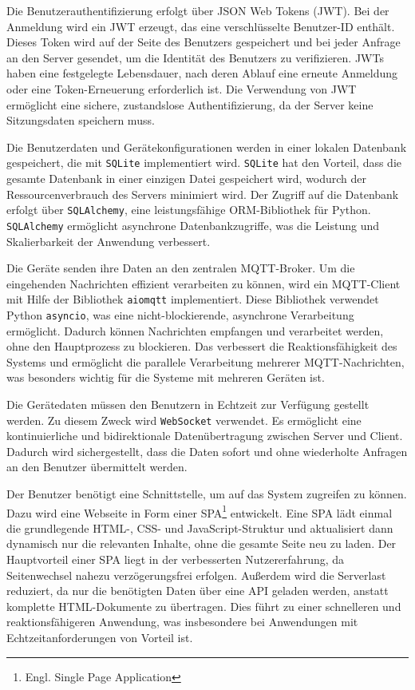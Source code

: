 \documentclass[12pt, letterpaper]{article}
\begin{document}
\par Die Benutzerauthentifizierung erfolgt über JSON Web Tokens (JWT). Bei der Anmeldung wird ein JWT erzeugt, das eine verschlüsselte Benutzer-ID enthält. Dieses Token wird auf der Seite des Benutzers gespeichert und bei jeder Anfrage an den Server gesendet, um die Identität des Benutzers zu verifizieren. JWTs haben eine festgelegte Lebensdauer, nach deren Ablauf eine erneute Anmeldung oder eine Token-Erneuerung erforderlich ist. Die Verwendung von JWT ermöglicht eine sichere, zustandslose Authentifizierung, da der Server keine Sitzungsdaten speichern muss.
\par Die Benutzerdaten und Gerätekonfigurationen werden in einer lokalen Datenbank gespeichert, die mit \texttt{SQLite} implementiert wird. \texttt{SQLite} hat den Vorteil, dass die gesamte Datenbank in einer einzigen Datei gespeichert wird, wodurch der Ressourcenverbrauch des Servers minimiert wird. Der Zugriff auf die Datenbank erfolgt über \texttt{SQLAlchemy}, eine leistungsfähige ORM-Bibliothek für Python. \texttt{SQLAlchemy} ermöglicht asynchrone Datenbankzugriffe, was die Leistung und Skalierbarkeit der Anwendung verbessert.
\par Die Geräte senden ihre Daten an den zentralen MQTT-Broker. Um die eingehenden Nachrichten effizient verarbeiten zu können, wird ein MQTT-Client mit Hilfe der Bibliothek \texttt{aiomqtt} implementiert. Diese Bibliothek verwendet Python \texttt{asyncio}, was eine nicht-blockierende, asynchrone Verarbeitung ermöglicht. Dadurch können Nachrichten empfangen und verarbeitet werden, ohne den Hauptprozess zu blockieren. Das verbessert die Reaktionsfähigkeit des Systems und ermöglicht die parallele Verarbeitung mehrerer MQTT-Nachrichten, was besonders wichtig für die Systeme mit mehreren Geräten ist.
\par Die Gerätedaten müssen den Benutzern in Echtzeit zur Verfügung gestellt werden. Zu diesem Zweck wird \texttt{WebSocket} verwendet. Es ermöglicht eine kontinuierliche und bidirektionale Datenübertragung zwischen Server und Client. Dadurch wird sichergestellt, dass die Daten sofort und ohne wiederholte Anfragen an den Benutzer übermittelt werden.
\par Der Benutzer benötigt eine Schnittstelle, um auf das System zugreifen zu können. Dazu wird eine Webseite in Form einer SPA\footnote{Engl. Single Page Application} entwickelt. Eine SPA lädt einmal die grundlegende HTML-, CSS- und JavaScript-Struktur und aktualisiert dann dynamisch nur die relevanten Inhalte, ohne die gesamte Seite neu zu laden. Der Hauptvorteil einer SPA liegt in der verbesserten Nutzererfahrung, da Seitenwechsel nahezu verzögerungsfrei erfolgen. Außerdem wird die Serverlast reduziert, da nur die benötigten Daten über eine API geladen werden, anstatt komplette HTML-Dokumente zu übertragen. Dies führt zu einer schnelleren und reaktionsfähigeren Anwendung, was insbesondere bei Anwendungen mit Echtzeitanforderungen von Vorteil ist. 
\end{document}
